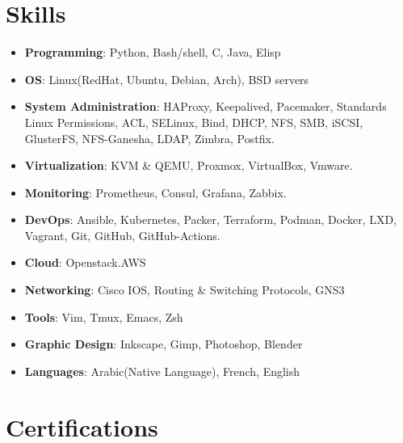 \documentclass{cv}
\begin{document}
\section{Skills}
\begin{itemize}
  \item{\bf{Programming}}: Python, Bash/shell, C, Java, Elisp 
  \item{\bf{OS}}: Linux(RedHat, Ubuntu, Debian, Arch), BSD servers

  \item{\bf{System Administration}}: HAProxy, Keepalived, Pacemaker, Standards Linux Permissions, ACL, SELinux, Bind, DHCP, NFS, SMB, iSCSI, GlusterFS, NFS-Ganesha, LDAP, Zimbra, Postfix.
  \item{\bf{Virtualization}}: KVM \& QEMU, Proxmox, VirtualBox, Vmware.
  \item{\bf{Monitoring}}: Prometheus, Consul, Grafana, Zabbix.
  \item{\bf{DevOps}}: Ansible, Kubernetes, Packer, Terraform, Podman, Docker, LXD, Vagrant, Git, GitHub, GitHub-Actions.
  \item{\bf{Cloud}}: Openstack.AWS
  \item{\bf{Networking}}: Cisco IOS, Routing \& Switching Protocols, GNS3
  \item{\bf{Tools}}: Vim, Tmux, Emacs, Zsh
  \item{\bf{Graphic Design}}: Inkscape, Gimp, Photoshop, Blender
  \item{\bf{Languages}}: Arabic(Native Language), French, English


\end{itemize}


\section{Certifications}
  \\
  \\
\end{document}
